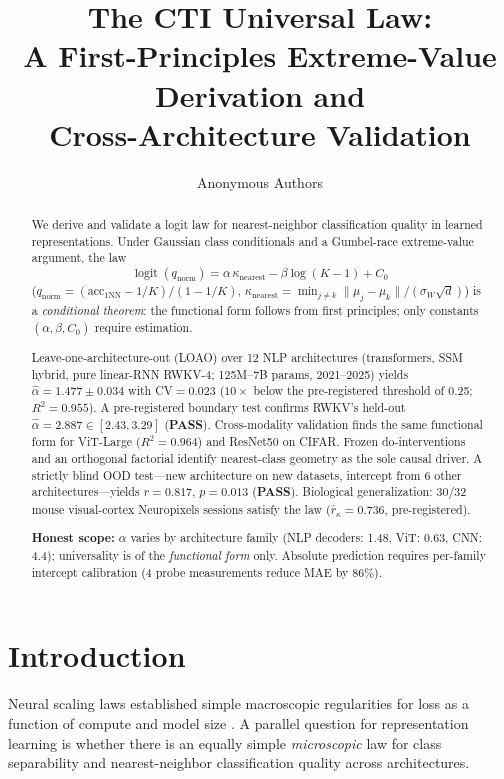 \documentclass{article}
\title{The CTI Universal Law:\\
A First-Principles Extreme-Value Derivation and\\
Cross-Architecture Validation}
\author{Anonymous Authors}
\DeclareMathOperator{\logit}{logit}
\begin{document}
\ifcolmsubmission
\linenumbers
\fi
\maketitle

\begin{abstract}
We derive and validate a logit law for nearest-neighbor classification quality in learned representations.
Under Gaussian class conditionals and a Gumbel-race extreme-value argument, the law
\begin{equation*}
\logit(q_{\mathrm{norm}})=\alpha\,\kappa_{\mathrm{nearest}}-\beta\log(K-1)+C_0
\end{equation*}
($q_{\mathrm{norm}}=(\mathrm{acc}_{1\mathrm{NN}}-1/K)/(1-1/K)$, $\kappa_{\mathrm{nearest}}=\min_{j\neq k}\|\mu_j-\mu_k\|/(\sigma_W\sqrt{d})$)
is a \emph{conditional theorem}: the functional form follows from first principles; only constants $(\alpha,\beta,C_0)$ require estimation.

Leave-one-architecture-out (LOAO) over 12 NLP architectures (transformers, SSM hybrid, pure linear-RNN RWKV-4; 125M--7B params, 2021--2025) yields $\hat\alpha=1.477\pm0.034$ with CV$=0.023$ ($10{\times}$ below the pre-registered threshold of 0.25; $R^2=0.955$).
A pre-registered boundary test confirms RWKV's held-out $\hat\alpha=2.887\in[2.43,3.29]$ (\textbf{PASS}).
Cross-modality validation finds the same functional form for ViT-Large ($R^2=0.964$) and ResNet50 on CIFAR.
Frozen do-interventions and an orthogonal factorial identify nearest-class geometry as the sole causal driver.
A strictly blind OOD test---new architecture on new datasets, intercept from 6 other architectures---yields $r=0.817$, $p=0.013$ (\textbf{PASS}).
Biological generalization: 30/32 mouse visual-cortex Neuropixels sessions satisfy the law ($\bar{r}_\kappa=0.736$, pre-registered).

\textbf{Honest scope:} $\alpha$ varies by architecture family (NLP decoders: 1.48, ViT: 0.63, CNN: 4.4); universality is of the \emph{functional form} only.
Absolute prediction requires per-family intercept calibration (4 probe measurements reduce MAE by 86\%).
\end{abstract}

\section{Introduction}
Neural scaling laws established simple macroscopic regularities for loss as a function of compute and model size \citep{kaplan2020,hoffmann2022}. A parallel question for representation learning is whether there is an equally simple \emph{microscopic} law for class separability and nearest-neighbor classification quality across architectures.
\end{document}
